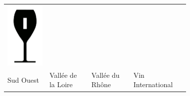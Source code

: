 {\begin{center}
\begin{tabular}{ >{\centering\arraybackslash}p{0.18\linewidth}  >{\centering\arraybackslash}p{0.18\linewidth}  >{\centering\arraybackslash}p{0.18\linewidth}  >{\centering\arraybackslash}p{0.19\linewidth}}
\includegraphics[scale=0.021, trim= 0em -5em -5em -5em,]{Icones/icon_international_black.pdf}
\\
Sud Ouest  & \makecell{Vallée de\\la Loire}  & \makecell{Vallée du\\Rhône} & \makecell{Vin\\International} \\
\end{tabular}
\end{center}
}

